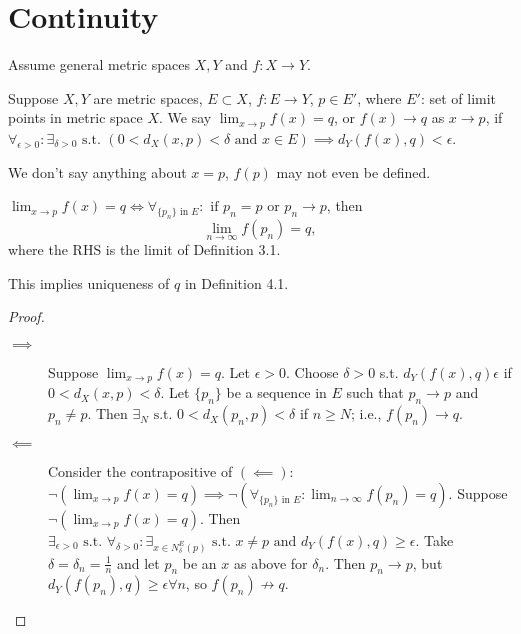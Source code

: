 \chapter{Continuity}
Assume general metric spaces $X,Y$ and $f: X\to Y$.
\begin{definition}
	\label{def:4.1}
	Suppose $X,Y$ are metric spaces, $E \subset X$, $f: E\to Y$, $p \in E'$, where $E'$: set of limit points in metric space $X$.
	We say $\lim_{x\to p}{f(x)}=q$, or $f(x)\to q$ as $x\to p$, if $\forall_{\epsilon > 0}: \exists_{\delta>0} \text{ s.t. } (0<d_X(x,p)<\delta \text{ and } x \in E) \implies d_Y(f(x),q)<\epsilon $.
	\begin{note}
		We don't say anything about $x=p$, $f(p)$ may not even be defined.
	\end{note}
\end{definition}


\begin{theorem}[2]
	$\lim_{x\to p}{f(x)}=q \Leftrightarrow \forall_{\{ {p}_{n}\} \text{ in } E}:
		\text{ if }  p_{n}=p \text{ or }  p_{n}\to p$, then
	\[
		\lim_{n\to \infty}{f(p_{n})}=q
		,\]
	where the RHS is the limit of Definition 3.1.
	\begin{note}
		This implies uniqueness of $q$ in Definition 4.1.
	\end{note}
	\begin{proof}
		\begin{description}
			\item[$\implies $]
			      Suppose $\lim_{x\to p}{f(x)}=q$. Let $\epsilon>0$. Choose $\delta>0$ s.t. $d_Y(f(x),q)\epsilon$ if $0<d_X(x,p)<\delta$.
			      Let $\{ p_{n} \}$ be a sequence in $E$ such that $p_{n}\to p$ and $p_{n}\neq p$. Then $\exists_{N} \text{ s.t. } 0<d_X(p_{n},p)<\delta $ if $n\ge N$; i.e., $f(p_n)\to q$.
			\item[$\impliedby$]
			      Consider the contrapositive of $(\impliedby) $: $\neg(\lim_{x\to p}{f(x)}=q) \implies \neg(\forall_{\{ p_{n} \} \text{ in } E}: \lim_{n\to \infty}{f(p_{n})}=q)$.
			      Suppose $\neg(\lim_{x\to p}{f(x)}=q)$. Then $\exists_{\epsilon>0} \text{ s.t. } \forall_{\delta>0}: \exists_{x\in N_{\delta}^{E}(p)} \text{ s.t. } x\neq p \text{ and } d_Y(f(x),q)\ge \epsilon$.
			      Take $\delta=\delta_n=\frac{1}{n}$ and let $p_{n}$ be an $x$ as above for $\delta_n$. Then $p_{n}\to p$, but $d_Y(f(p_{n}),q)\ge \epsilon \forall n$, so $f(p_{n})\not \to q$.
		\end{description}
	\end{proof}
\end{theorem}

